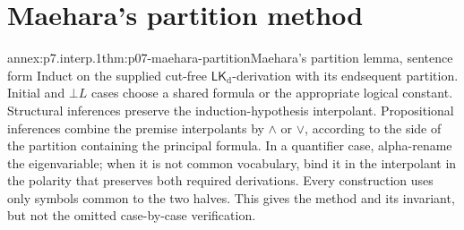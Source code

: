 
\section{Maehara's partition method}

\begin{annexitem}{annex:p7.interp.1}{thm:p07-maehara-partition}{Maehara's partition lemma, sentence form}
Induct on the supplied cut-free \(\mathsf{LK}_{\mathrm d}\)-derivation with
its endsequent partition.  Initial and \(\bot L\) cases choose a shared
formula or the appropriate logical constant.  Structural inferences preserve
the induction-hypothesis interpolant.  Propositional inferences combine the
premise interpolants by \(\land\) or \(\lor\), according to the side of the
partition containing the principal formula.  In a quantifier case,
alpha-rename the eigenvariable; when it is not common vocabulary, bind it in
the interpolant in the polarity that preserves both required derivations.
Every construction uses only symbols common to the two halves.  This gives
the method and its invariant, but not the omitted case-by-case verification.
\end{annexitem}
